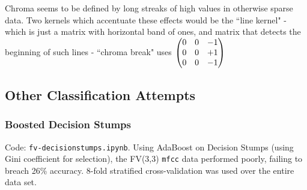 \documentclass{article}
\begin{document}
\begin{figure}[H]
\begin{minipage}[b]{0.3\textwidth}
    \end{minipage}
    
    \label{fig:chromakernels}
\end{figure}

    Chroma seems to be defined by long streaks of high values in otherwise sparse data. Two kernels which accentuate these effects would be the ``line kernel" - which is just a matrix with horizontal band of ones, and matrix that detects the beginning of such lines - ``chroma break" uses $\begin{pmatrix} 0&0&-1\\0&0&+1\\0&0&-1 \end{pmatrix}$

\subsection{Other Classification Attempts}

\subsubsection{Boosted Decision Stumps}\label{boostedstumps}

Code: \texttt{fv-decisionstumps.ipynb}. Using AdaBoost on Decision Stumps (using Gini coefficient for selection), the FV(3,3) \texttt{mfcc} data performed poorly, failing to breach 26\% accuracy. 8-fold stratified cross-validation was used over the entire data set.
\end{document}
